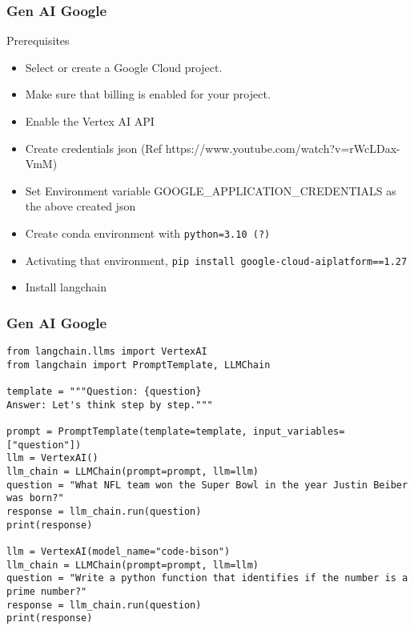 \begin{frame}[fragile]\frametitle{Gen AI Google}

Prerequisites
\begin{itemize}
\item Select or create a Google Cloud project.
\item Make sure that billing is enabled for your project.
\item Enable the Vertex AI API
\item Create credentials json (Ref https://www.youtube.com/watch?v=rWcLDax-VmM)
\item Set Environment variable GOOGLE\_APPLICATION\_CREDENTIALS as the above created json
\item Create conda environment with \lstinline|python=3.10 (?)|
\item Activating that environment, \lstinline|pip install google-cloud-aiplatform==1.27|
\item Install langchain
\end{itemize}


\end{frame}


\begin{frame}[fragile]\frametitle{Gen AI Google}


\begin{lstlisting}
from langchain.llms import VertexAI
from langchain import PromptTemplate, LLMChain

template = """Question: {question}
Answer: Let's think step by step."""

prompt = PromptTemplate(template=template, input_variables=["question"])
llm = VertexAI()
llm_chain = LLMChain(prompt=prompt, llm=llm)
question = "What NFL team won the Super Bowl in the year Justin Beiber was born?"
response = llm_chain.run(question)
print(response)

llm = VertexAI(model_name="code-bison")
llm_chain = LLMChain(prompt=prompt, llm=llm)
question = "Write a python function that identifies if the number is a prime number?"
response = llm_chain.run(question)
print(response)
\end{lstlisting}


\end{frame}




